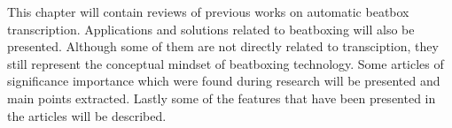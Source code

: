 This chapter will contain reviews of previous works on automatic beatbox transcription. Applications and solutions related to beatboxing will also be presented. Although some of them are not directly related to transciption, they still represent the conceptual mindset of beatboxing technology. Some articles of significance importance which were found during research will be presented and main points extracted. Lastly some of the features that have been presented in the articles will be described.